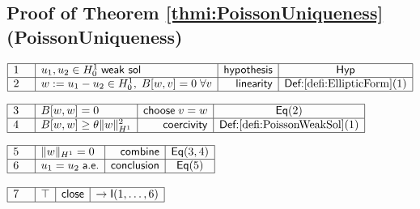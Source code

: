 \documentclass[11pt,reqno]{amsart}
\begin{document}
	\subsection*{Proof of Theorem \protect\ref{thmi:PoissonUniqueness} (\textsf{PoissonUniqueness})}
	\noindent$\begin{array}{|m{0.5cm}|l|r|c|}
	\hline
	1 & u_{1},u_{2}\in H_{0}^{1}\;\mathsf{weak\ sol} & \mathsf{hypothesis} & \mathsf{Hyp} \\ \hline
	2 & w:=u_{1}-u_{2}\in H_{0}^{1},\;B[w,v]=0\;\forall v & \mathsf{linearity} & \textsf{Def:}\ref{defi:EllipticForm}(1) \\ \hline
	\end{array}$
	\par\nointerlineskip\noindent$\begin{array}{|m{0.5cm}|l|r|c|}
	\hline
	3 & B[w,w]=0 & \mathsf{choose}\;v=w & \mathsf{Eq}(2) \\ \hline
	4 & B[w,w]\ge\theta\|w\|_{H^{1}}^{2} & \mathsf{coercivity} & \textsf{Def:}\ref{defi:PoissonWeakSol}(1) \\ \hline
	\end{array}$
	\par\nointerlineskip\noindent$\begin{array}{|m{0.5cm}|l|r|c|}
	\hline
	5 & \|w\|_{H^{1}}=0 & \mathsf{combine} & \mathsf{Eq}(3,4) \\ \hline
	6 & u_{1}=u_{2}\;\mathsf{a.e.} & \mathsf{conclusion} & \mathsf{Eq}(5) \\ \hline
	\end{array}$
	\par\nointerlineskip\noindent$\begin{array}{|m{0.5cm}|l|r|c|}
	\hline
	7 & \top & \mathsf{close} & \to\mathsf{I}(1,\dots,6) \\ \hline
	\end{array}$
	\medskip
	
\end{document}
